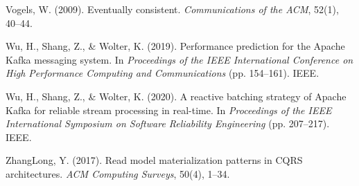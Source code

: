 \documentclass[10pt,a4paper]{article}
\begin{document}
\begin{flushleft}
Vogels, W. (2009). Eventually consistent. \textit{Communications of the ACM}, 52(1), 40--44.

Wu, H., Shang, Z., \& Wolter, K. (2019). Performance prediction for the Apache Kafka messaging system. In \textit{Proceedings of the IEEE International Conference on High Performance Computing and Communications} (pp. 154--161). IEEE.

Wu, H., Shang, Z., \& Wolter, K. (2020). A reactive batching strategy of Apache Kafka for reliable stream processing in real-time. In \textit{Proceedings of the IEEE International Symposium on Software Reliability Engineering} (pp. 207--217). IEEE.

ZhangLong, Y. (2017). Read model materialization patterns in CQRS architectures. \textit{ACM Computing Surveys}, 50(4), 1--34.

\end{flushleft}
\end{document}
